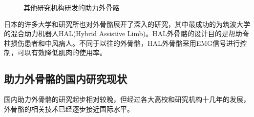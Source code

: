 \begin{figure}[htb]
    \quad
    \caption{其他研究机构研发的助力外骨骼}
    \label{fig:subfigss}
\end{figure}

日本的许多大学和研究所也对外骨骼展开了深入的研究，其中最成功的为筑波大学的混合助力机器人HAL\cite{p13}(Hybrid Assistive Limb)。HAL外骨骼的设计目的是帮助脊柱损伤患者和中风病人。不同于以往的外骨骼，HAL外骨骼采用EMG信号进行控制，可以有效降低肌肉的使用率。

\subsection{助力外骨骼的国内研究现状}

国内助力外骨骼的研究起步相对较晚，但经过各大高校和研究机构十几年的发展，外骨骼的相关技术已经逐步接近国际水平。

